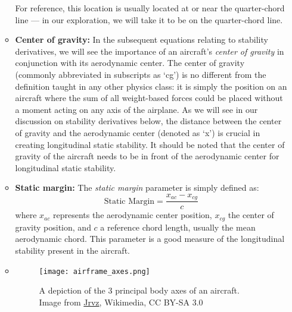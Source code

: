 \documentclass{article}
\begin{document}
\begin{itemize}
\begin{itemize}
            For reference, this location is usually located at or near the quarter-chord line --- in our exploration, we will take it to be on the quarter-chord line.
            \item[] \textbf{Center of gravity:} In the subsequent equations relating to stability derivatives, we will see the importance of an aircraft's \textit{center of gravity} in conjunction with its aerodynamic center.
            The center of gravity (commonly abbreviated in subscripts as `cg') is no different from the definition taught in any other physics class: it is simply the position on an aircraft where the sum of all weight-based forces could be placed without a moment acting on any axis of the airplane.
            As we will see in our discussion on stability derivatives below, the distance between the center of gravity and the aerodynamic center (denoted as `x') is crucial in creating longitudinal static stability. It should be noted that the center of gravity of the aircraft needs to be in front of the aerodynamic center for longitudinal static stability.
            \item[] \textbf{Static margin:} The \textit{static margin} parameter is simply defined as:
            \begin{equation}\label{eq:static_margin}
                \text{Static Margin} =  \frac{x_{ac} - x_{cg}}{c}
            \end{equation}
            where $x_{ac}$ represents the aerodynamic center position, $x_{cg}$ the center of gravity position, and $c$ a reference chord length, usually the mean aerodynamic chord.
            This parameter is a good measure of the longitudinal stability present in the aircraft.
            \item[]
                \noindent
                \begin{minipage}{\linewidth}
                    \centering
                    \begin{figure}[H]
                        \centering
                        \texttt{[image: airframe\_axes.png]}
                        
                        \captionsetup{width=0.995\linewidth, justification=raggedright}
                        \caption{A depiction of the 3 principal body axes of an aircraft. Image from
                        \href{https://commons.wikimedia.org/wiki/File:Yaw_Axis_Corrected.svg}{Jrvz}, Wikimedia, CC BY-SA 3.0}\label{fig:airframe_axes}
                    \end{figure}
                \end{minipage}
            \vspace{12pt}
    

\end{itemize}
\end{itemize}
\end{document}
